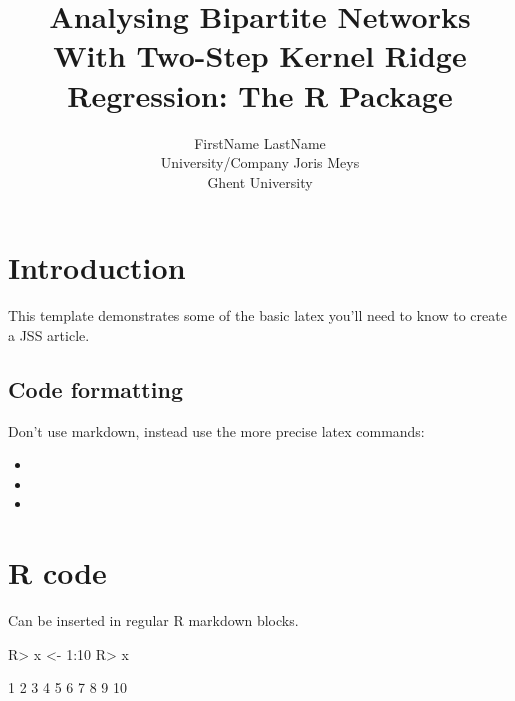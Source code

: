 \documentclass[jss]{jss}
\author{
FirstName LastName\\University/Company \And Joris Meys\\Ghent University
}
\title{Analysing Bipartite Networks With Two-Step Kernel Ridge Regression: The
R Package \pkg{xnet}}
\begin{document}
\hypertarget{introduction}{%
\section{Introduction}\label{introduction}}

This template demonstrates some of the basic latex you'll need to know
to create a JSS article.

\hypertarget{code-formatting}{%
\subsection{Code formatting}\label{code-formatting}}

Don't use markdown, instead use the more precise latex commands:

\begin{itemize}
\item
\item
\item
\end{itemize}

\hypertarget{r-code}{%
\section{R code}\label{r-code}}

Can be inserted in regular R markdown blocks.

\begin{CodeChunk}

\begin{CodeInput}
R> x <- 1:10
R> x
\end{CodeInput}

\begin{CodeOutput}
 [1]  1  2  3  4  5  6  7  8  9 10
\end{CodeOutput}
\end{CodeChunk}


\end{document}
